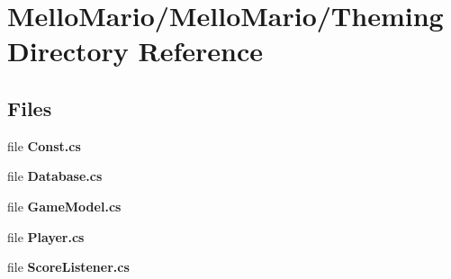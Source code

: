 \section{Mello\+Mario/\+Mello\+Mario/\+Theming Directory Reference}
\label{dir_6384bf75c87c3f704602c0b4de91c407}
\subsection*{Files}
\begin{DoxyCompactItemize}
\item 
file \textbf{ Const.\+cs}
\item 
file \textbf{ Database.\+cs}
\item 
file \textbf{ Game\+Model.\+cs}
\item 
file \textbf{ Player.\+cs}
\item 
file \textbf{ Score\+Listener.\+cs}
\end{DoxyCompactItemize}
